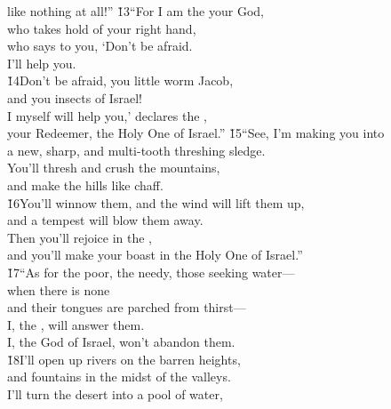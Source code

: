 \begin{poetry}
\poemll    like nothing at all!''
\poeml \v{13}``For I am the  your God, \\
\poemll    who takes hold of your right hand, \\
\poeml who says to you, `Don't be afraid. \\
\poemll    I'll help you. \\
\poeml \v{14}Don't be afraid, you little worm Jacob, \\
\poemll    and you insects of Israel! \\
\poeml I myself will help you,' declares the , \\
\poemll    your Redeemer, the Holy One of Israel.''
\poeml \v{15}``See, I'm making you into \\
\poemll    a new, sharp, and multi-tooth threshing sledge. \\
\poeml You'll thresh and crush the mountains, \\
\poemll    and make the hills like chaff. \\
\poeml \v{16}You'll winnow them, and the wind will lift them up, \\
\poemll    and a tempest will blow them away. \\
\poeml Then you'll rejoice in the , \\
\poemll    and you'll make your boast in the Holy One of Israel.'' \\
\poeml \v{17}``As for the poor, the needy, those seeking water--- \\
\poemll    when there is none \\
\poemlll       and their tongues are parched from thirst--- \\
\poeml I, the , will answer them. \\
\poemll    I, the God of Israel, won't abandon them. \\
\poeml \v{18}I'll open up rivers on the barren heights, \\
\poemll    and fountains in the midst of the valleys. \\
\poeml I'll turn the desert into a pool of water, \\

\end{poetry}
